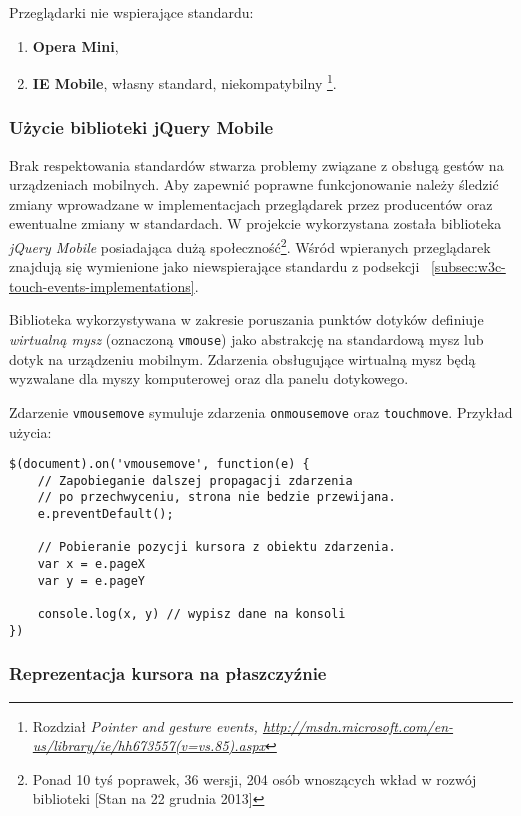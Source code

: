 Przeglądarki nie wspierające standardu:

\begin{enumerate}
  \item \textbf{Opera Mini},
  \item \textbf{IE Mobile}, własny standard, niekompatybilny\cite{browser-ie} \footnote{\cite{browser-ie} Rozdział \em{Pointer and gesture events}, \url{http://msdn.microsoft.com/en-us/library/ie/hh673557(v=vs.85).aspx}}.
\end{enumerate}

\subsubsection{Użycie biblioteki jQuery Mobile}

Brak respektowania standardów stwarza problemy związane z obsługą gestów na urządzeniach mobilnych. Aby zapewnić poprawne funkcjonowanie należy śledzić zmiany wprowadzane w implementacjach przeglądarek przez producentów oraz ewentualne zmiany w standardach. W projekcie wykorzystana została biblioteka \emph{jQuery Mobile} posiadająca dużą społeczność\footnote{Ponad 10 tyś poprawek, 36 wersji, 204 osób wnoszących wkład w rozwój biblioteki [Stan na 22 grudnia 2013]}. Wśród wpieranych przeglądarek znajdują się wymienione jako niewspierające standardu z podsekcji ~\ref{subsec:w3c-touch-events-implementations}.

Biblioteka wykorzystywana w zakresie poruszania punktów dotyków definiuje \emph{wirtualną mysz} (oznaczoną \lstinline{vmouse}) jako abstrakcję na standardową mysz lub dotyk na urządzeniu mobilnym. Zdarzenia obsługujące wirtualną mysz będą wyzwalane dla myszy komputerowej oraz dla panelu dotykowego.

Zdarzenie \lstinline{vmousemove} symuluje zdarzenia \lstinline{onmousemove} oraz \lstinline{touchmove}. Przykład użycia:

\lstset{language=JavaScript}
\begin{lstlisting}
$(document).on('vmousemove', function(e) {
	// Zapobieganie dalszej propagacji zdarzenia
	// po przechwyceniu, strona nie bedzie przewijana.
	e.preventDefault();
	
	// Pobieranie pozycji kursora z obiektu zdarzenia.
	var x = e.pageX
	var y = e.pageY
	
	console.log(x, y) // wypisz dane na konsoli
})
\end{lstlisting}

\subsubsection{Reprezentacja kursora na płaszczyźnie}

